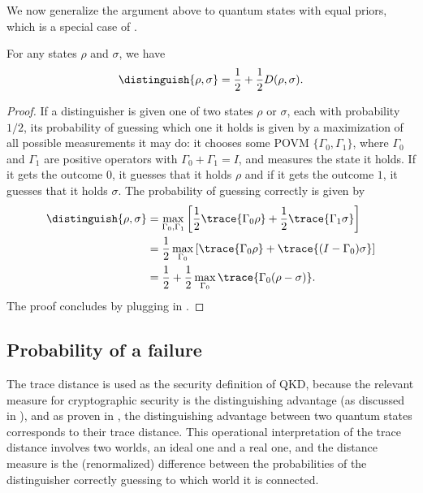 We now generalize the argument above to quantum states with equal
priors, which is a special case of \textcite{Hel76}.

\begin{thm}
  \label{thm:op.distinguishing}
  For any states $\rho$ and $\sigma$, we have \[\distinguish{\rho,\sigma} =
  \frac{1}{2}+\frac{1}{2}D(\rho,\sigma) .\]
\end{thm}

\begin{proof}
  If a distinguisher is given one of two states $\rho$ or $\sigma$,
  each with probability $1/2$, its probability of guessing which one
  it holds is given by a maximization of all possible measurements it
  may do: it chooses some POVM $\{\Gamma_0,\Gamma_1\}$, where
  $\Gamma_0$ and $\Gamma_1$ are positive operators with
  $\Gamma_0+\Gamma_1 = I$, and measures the state it holds. If it gets
  the outcome $0$, it guesses that it holds $\rho$ and if it gets the
  outcome $1$, it guesses that it holds $\sigma$. The probability of
  guessing correctly is given by
\begin{align}
  \distinguish{\rho,\sigma} & = \max_{\Gamma_0,\Gamma_1} \left[
    \frac{1}{2}\trace{\Gamma_0\rho} +
    \frac{1}{2}\trace{\Gamma_1\sigma} \right] \notag \\
  & = \frac{1}{2}\max_{\Gamma_0} \left[ \trace{\Gamma_0\rho} +
    \trace{(I-\Gamma_0)\sigma} \right] \notag \\
  & = \frac{1}{2} + \frac{1}{2} \max_{\Gamma_0}
  \trace{\Gamma_0(\rho-\sigma)} . \label{eq:op.distinguishing.thm}
\end{align}
The proof concludes by plugging  in
.
\end{proof}

\subsection{Probability of a failure}
\label{app:op.failure}

The trace distance is used as the security definition of QKD, because
the relevant measure for cryptographic security is the distinguishing
advantage (as discussed in ), and as proven in
, the distinguishing advantage between
two quantum states corresponds to their trace distance. This
operational interpretation of the trace distance involves two worlds,
an ideal one and a real one, and the distance measure is the
(renormalized) difference between the probabilities of the
distinguisher correctly guessing to which world it is connected.

